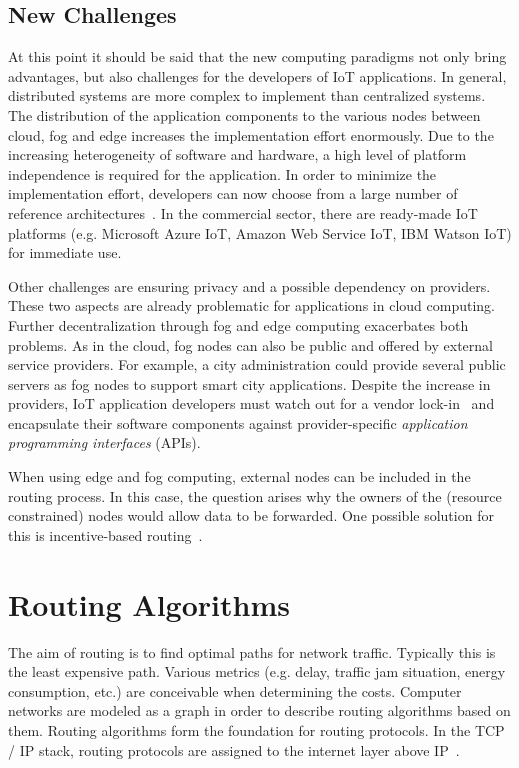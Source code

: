 \documentclass[english,version-2019-11]{uzl-thesis}
\begin{document}
\subsection{New Challenges}
At this point it should be said that the new computing paradigms
not only bring advantages, but also challenges for the developers
of IoT applications. In general, distributed systems are more complex
to implement than centralized systems. 
The distribution of the application components to the various
nodes between cloud, fog and edge increases the implementation
effort enormously. Due to the increasing heterogeneity of software
and hardware, a high level of platform independence is required
for the application.
In order to minimize the implementation effort, developers can now
choose from a large number of reference architectures~\cite{ComparisonIoTPlatformArchitectures}.
In the commercial sector, there are ready-made IoT platforms
(e.g. Microsoft Azure IoT, Amazon Web Service IoT, IBM Watson IoT)
for immediate use.

Other challenges are ensuring privacy and a possible dependency on providers.
These two aspects are already problematic for applications in cloud computing.
Further decentralization through fog and edge computing exacerbates
both problems. As in the cloud, fog nodes can also be public and offered
by external service providers. For example, a city administration could
provide several public servers as fog nodes to support smart city applications.
Despite the increase in providers, IoT application developers must watch
out for a vendor lock-in~\cite{VendorLockIn} and encapsulate their software components
against provider-specific \emph{application programming interfaces} (APIs).

When using edge and fog computing, external nodes can be included
in the routing process. In this case, the question arises why
the owners of the (resource constrained) nodes would allow data
to be forwarded. One possible solution for this
is incentive-based routing~\cite{RoutingIssuesSurvey}.


\section{Routing Algorithms}
The aim of routing is to find optimal paths for network traffic.
Typically this is the least expensive path. Various metrics
(e.g. delay, traffic jam situation, energy consumption, etc.)
are conceivable when determining the costs. Computer networks
are modeled as a graph in order to describe routing algorithms
based on them. Routing algorithms form the foundation for
routing protocols. In the TCP / IP stack, routing
protocols are assigned to the internet layer above IP~\cite{Tanenbaum}.
\end{document}
